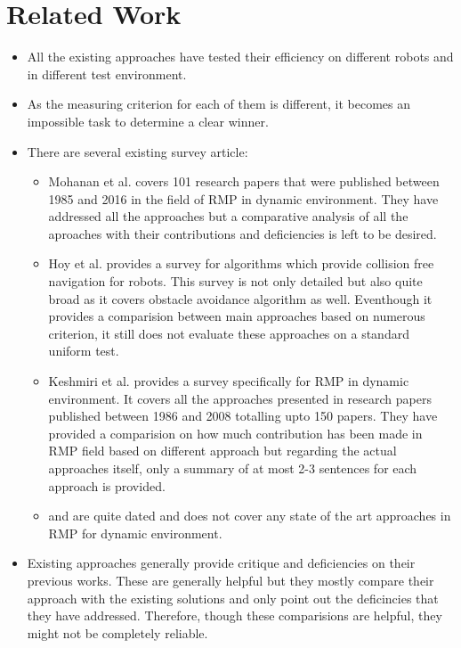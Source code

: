\documentclass[rnd]{mas_proposal}
\begin{document}
\chapter{Related Work}
\begin{itemize}
    \item All the existing approaches have tested their efficiency on different robots and in different test environment.
    \item As the measuring criterion for each of them is different, it becomes an impossible task to determine a clear winner.
    \item There are several existing survey article:
        \begin{itemize}
            \item Mohanan et al. \cite{mohanan2018a} covers 101 research papers that were published between 1985 and 2016 in the field of RMP in dynamic environment. 
                They have addressed all the approaches but a comparative analysis of all the aproaches with their contributions and deficiencies is left to be desired.
            \item Hoy et al. \cite{hoy2015algorithms} provides a survey for algorithms which provide collision free navigation for robots. 
                This survey is not only detailed but also quite broad as it covers obstacle avoidance algorithm as well. 
                Eventhough it provides a comparision between main approaches based on numerous criterion, it still does not evaluate these approaches on a standard uniform test.
            \item Keshmiri et al.\cite{keshmiri2009overview} provides a survey specifically for RMP in dynamic environment. 
                It covers all the approaches presented in research papers published between 1986 and 2008 totalling upto 150 papers. 
                They have provided a comparision on how much contribution has been made in RMP field based on different approach but regarding the actual approaches itself, only a summary of at most 2-3 sentences for each approach is provided.
            \item \cite{fujimura1991motion} and \cite{tsubouchi1996motion} are quite dated and does not cover any state of the art approaches in RMP for dynamic environment.
        \end{itemize}
    \item Existing approaches generally provide critique and deficiencies on their previous works. These are generally helpful but they mostly compare their approach with the existing solutions and only point out the deficincies that they have addressed. Therefore, though these comparisions are helpful, they might not be completely reliable.
\end{itemize}
\end{document}
